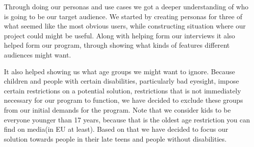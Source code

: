 Through doing our personas and use cases we got a deeper understanding of who is going to be our target audience. We started by creating personas for three of what seemed like the most obvious users, while constructing situation where our project could might be useful. Along with helping form our interviews it also helped form our program, through showing what kinds of features different audiences might want.

It also helped showing us what age groups we might want to ignore. Because children and people with certain disabilities, particularly bad eyesight, impose certain restrictions on a potential solution, restrictions that is not immediately necessary for our program to function, we have decided to exclude these groups from our initial demands for the program. Note that we consider kids to be everyone younger than 17 years, because that is the oldest age restriction you can find on media(in EU at least). Based on that we have decided to focus our solution towards people in their late teens and people without disabilities.